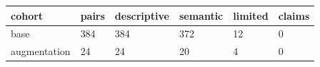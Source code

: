 \begin{tabular}{llllll}
\hline
cohort & pairs & descriptive & semantic & limited & claims \\
\hline
base & 384 & 384 & 372 & 12 & 0 \\
augmentation & 24 & 24 & 20 & 4 & 0 \\
\hline
\end{tabular}
